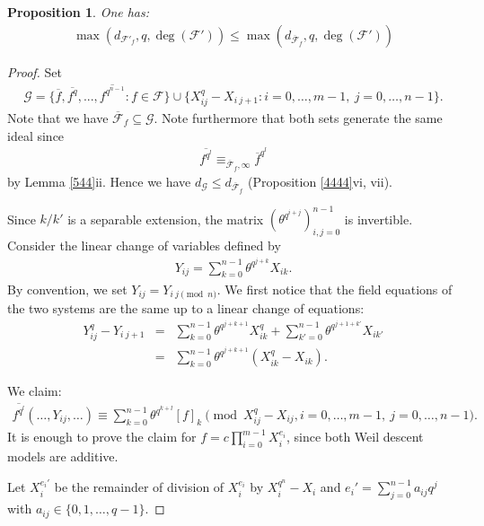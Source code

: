 \documentclass{amsart}
\theoremstyle{plain}
\newtheorem{proposition}[theorem]{Proposition}
\theoremstyle{definition}
\begin{document}
\begin{proposition} \label{yang}
One has:
\begin{eqnarray*}
\max(d_{\mathcal{F}'_f},q,\deg(\mathcal{F}')) \leq \max(d_{\overline{\mathcal{F}}_f},q,\deg(\mathcal{F}'))
\end{eqnarray*}
\end{proposition}
\begin{proof}
Set
\begin{eqnarray*}
\mathcal{G}=\{\overline{f}, \overline{f^q} ,...,\overline{f^{q^{n-1}}} :f\in\mathcal{F}\} \cup \{X_{ij}^q-X_{i\ j+1}: i=0,\ldots,m-1,\  j=0,\ldots,n-1\}.
\end{eqnarray*}
Note that we have $\overline{\mathcal{F}}_f \subseteq \mathcal{G}$. Note furthermore that both sets generate the same ideal since
\begin{eqnarray*} 
\overline{f^{q^l}} \equiv_{\overline{\mathcal{F}}_f,\infty} \overline{f}^{q^l}
\end{eqnarray*}
by Lemma \ref{544}ii. Hence we have $d_{\mathcal{G}} \leq d_{\overline{\mathcal{F}}_f}$ (Proposition \ref{4444}vi, vii).

Since $k/k'$ is a separable extension, the matrix $(\theta^{q^{i+j}})_{i,j=0}^{n-1}$ is invertible. Consider the linear change of variables defined by
\begin{eqnarray*}
Y_{ij}=\sum_{k=0}^{n-1}\theta^{q^{j+k}}X_{ik}.
\end{eqnarray*}
By convention, we set $Y_{ij}=Y_{i\ j \pmod{n}}$. 
We first notice that the field equations of the two systems are the same up to a linear change of equations:
\begin{eqnarray*}
 Y_{ij}^q-Y_{i\ j+1}&=& \sum_{k=0}^{n-1}\theta^{q^{j+k+1}}X_{ik}^q + \sum_{k'=0}^{n-1}\theta^{q^{j+1+k'}}X_{ik'}\\
&=&  \sum_{k=0}^{n-1}\theta^{q^{j+k+1}}(X_{ik}^q-X_{ik}).
\end{eqnarray*}

We claim:
\begin{eqnarray*}
 \overline{f^{q^l}}(\ldots,Y_{ij},\ldots) 
\equiv\sum_{k=0}^{n-1}\theta^{q^{k+l}}[f]_k\pmod{X_{ij}^q-X_{ij}, i=0,\ldots,m-1,\ j=0,\ldots,n-1}.
\end{eqnarray*}
It is enough to prove the claim for $f=c\prod_{i=0}^{m-1}X_i^{e_i}$, since both Weil descent models are additive.

Let $X_i^{e_i'}$ be the remainder of division of $X_i^{e_i}$ by ${X_i^{q^n}-X_i}$ and $e_i'=\sum_{j=0}^{n-1} a_{ij}q^j$ with $a_{ij} \in \{0,1,\ldots,q-1\}$.


\end{proof}
\end{document}
